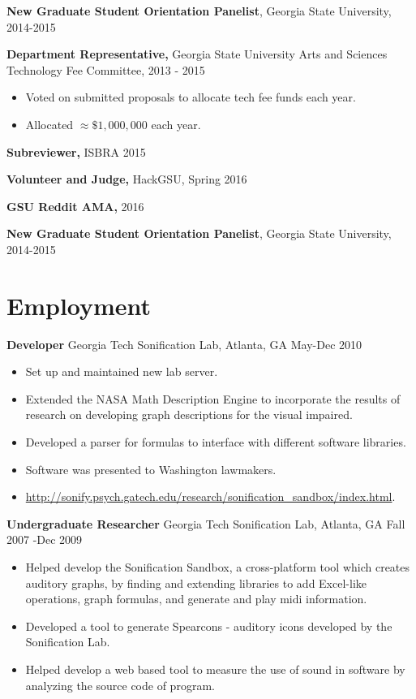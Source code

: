 \documentclass{res}
\begin{document}
\begin{resume}
{\bf New Graduate Student Orientation Panelist}, Georgia State University, 2014-2015


{\bf Department Representative,} Georgia State University Arts and Sciences Technology Fee Committee, 2013 - 2015
\begin{itemize}
	\item Voted on submitted proposals to allocate tech fee funds each year.
	\item Allocated $\approx \$1,000,000$ each year.
\end{itemize}

{\bf Subreviewer,} ISBRA 2015

{\bf Volunteer and Judge,} HackGSU, Spring 2016

{\bf GSU Reddit AMA,} 2016



{\bf New Graduate Student Orientation Panelist}, Georgia State University, 2014-2015


\section{Employment}
% 
{\bf Developer} Georgia Tech Sonification Lab, Atlanta, GA May-Dec 2010
	\begin{itemize}
		\item Set up and maintained new lab server.
		\item Extended the NASA Math Description Engine to incorporate the results of research on developing graph descriptions for the visual impaired.
		\item Developed a parser for formulas to interface with different software libraries.
		\item Software was presented to Washington lawmakers.
		\item \url{http://sonify.psych.gatech.edu/research/sonification_sandbox/index.html}.
    \end{itemize}      
    
{\bf Undergraduate Researcher} Georgia Tech Sonification Lab, Atlanta, GA Fall 2007 -Dec 2009
	\begin{itemize}
		\item Helped develop the Sonification Sandbox, a cross-platform tool which creates auditory graphs, by finding and extending libraries to add Excel-like operations, graph formulas, and generate and play midi information.
		\item Developed a tool to generate Spearcons - auditory icons developed by the Sonification Lab.
		\item Helped develop a web based tool to measure the use of sound in software by analyzing the source code of program.
    \end{itemize}      
    


\end{resume}
\end{document}
